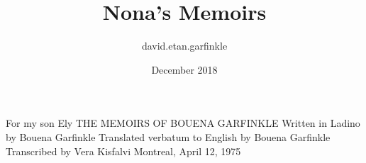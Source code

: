 \documentclass{article}
\title{Nona's Memoirs}
\author{david.etan.garfinkle}
\date{December 2018}
\begin{document}
For my son Ely 
THE MEMOIRS OF BOUENA GARFINKLE 
Written in Ladino by Bouena Garfinkle 
Translated verbatum to English by Bouena Garfinkle 
Transcribed by Vera Kisfalvi 
Montreal, April 12, 1975 



\maketitle




\end{document}
